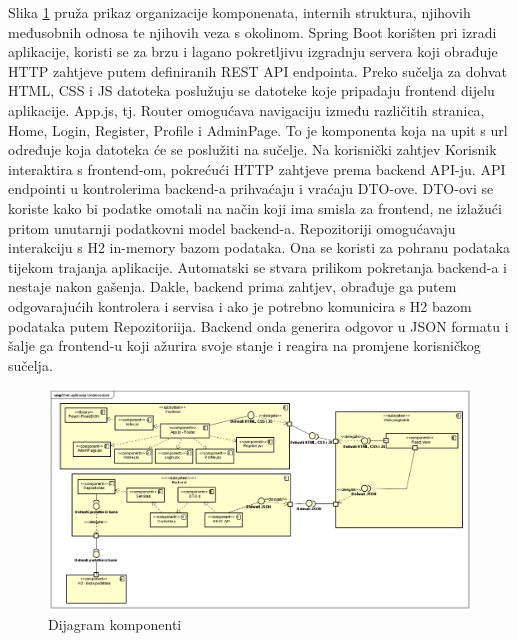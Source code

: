 			Slika \ref{fig:dijagram_komponenti} pruža prikaz organizacije komponenata, internih struktura, njihovih međusobnih odnosa te njihovih veza s okolinom.
			Spring Boot korišten pri izradi aplikacije, koristi se za brzu i lagano pokretljivu izgradnju servera koji obrađuje HTTP zahtjeve putem definiranih REST API endpointa.
			Preko sučelja za dohvat HTML, CSS i JS datoteka poslužuju se datoteke koje pripadaju frontend dijelu aplikacije. App.js, tj. Router omogućava navigaciju između različitih stranica, Home, Login, Register, Profile i AdminPage. To je komponenta koja na upit s url određuje koja datoteka će se poslužiti na sučelje.
			Na korisnički zahtjev Korisnik interaktira s frontend-om, pokrećući HTTP zahtjeve prema backend API-ju. API endpointi u kontrolerima backend-a prihvaćaju i vraćaju DTO-ove. DTO-ovi se koriste kako bi podatke omotali na način koji ima smisla za frontend, ne izlažući pritom unutarnji podatkovni model backend-a. Repozitoriji omogućavaju interakciju s H2 in-memory bazom podataka. Ona se koristi za pohranu podataka tijekom trajanja aplikacije. Automatski se stvara prilikom pokretanja backend-a i nestaje nakon gašenja. Dakle, backend prima zahtjev, obrađuje ga putem odgovarajućih kontrolera i servisa i ako je potrebno komunicira s H2 bazom podataka putem Repozitoriija. Backend onda generira odgovor u JSON formatu i šalje ga frontend-u koji ažurira svoje stanje i reagira na promjene korisničkog sučelja.
			\begin{figure}
				\includegraphics[scale=0.57]{slike/dijagram_komponenti.png}
				\centering
				\caption{Dijagram komponenti}
				\label{fig:dijagram_komponenti}
			\end{figure}